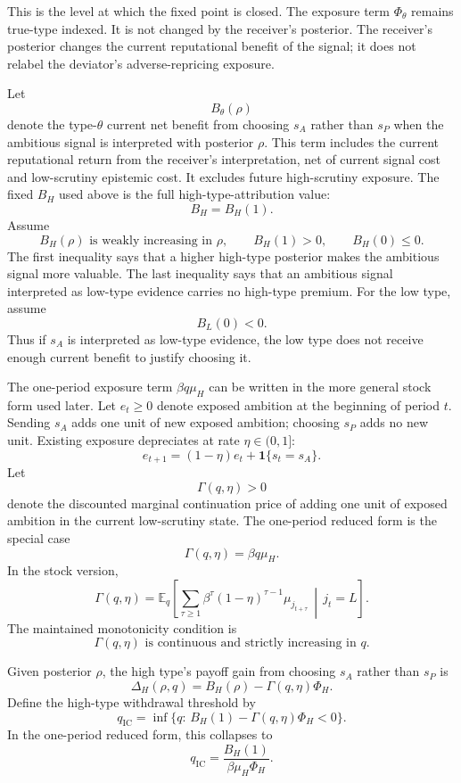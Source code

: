 This is the level at which the fixed point is closed. The exposure term \(\Phi_\theta\) remains true-type indexed. It is not changed by the receiver's posterior. The receiver's posterior changes the current reputational benefit of the signal; it does not relabel the deviator's adverse-repricing exposure.

Let
\[
B_\theta(\rho)
\]
denote the type-\(\theta\) current net benefit from choosing \(s_A\) rather than \(s_P\) when the ambitious signal is interpreted with posterior \(\rho\). This term includes the current reputational return from the receiver's interpretation, net of current signal cost and low-scrutiny epistemic cost. It excludes future high-scrutiny exposure. The fixed \(B_H\) used above is the full high-type-attribution value:
\[
B_H=B_H(1).
\]
Assume
\[
B_H(\rho)\text{ is weakly increasing in }\rho,
\qquad
B_H(1)>0,
\qquad
B_H(0)\le 0.
\]
The first inequality says that a higher high-type posterior makes the ambitious signal more valuable. The last inequality says that an ambitious signal interpreted as low-type evidence carries no high-type premium. For the low type, assume
\[
B_L(0)<0.
\]
Thus if \(s_A\) is interpreted as low-type evidence, the low type does not receive enough current benefit to justify choosing it.

The one-period exposure term \(\beta q\mu_H\) can be written in the more general stock form used later. Let \(e_t\ge 0\) denote exposed ambition at the beginning of period \(t\). Sending \(s_A\) adds one unit of new exposed ambition; choosing \(s_P\) adds no new unit. Existing exposure depreciates at rate \(\eta\in(0,1]\):
\[
e_{t+1}=(1-\eta)e_t+\mathbf{1}\{s_t=s_A\}.
\]
Let
\[
\Gamma(q,\eta)>0
\]
denote the discounted marginal continuation price of adding one unit of exposed ambition in the current low-scrutiny state. The one-period reduced form is the special case
\[
\Gamma(q,\eta)=\beta q\mu_H.
\]
In the stock version,
\[
\Gamma(q,\eta)
=
\mathbb E_q\left[
\sum_{\tau\ge 1}
\beta^\tau (1-\eta)^{\tau-1}\mu_{j_{t+\tau}}
\,\middle|\,j_t=L
\right].
\]
The maintained monotonicity condition is
\[
\Gamma(q,\eta)\text{ is continuous and strictly increasing in }q.
\]

Given posterior \(\rho\), the high type's payoff gain from choosing \(s_A\) rather than \(s_P\) is
\[
\Delta_H(\rho,q)
=
B_H(\rho)-\Gamma(q,\eta)\Phi_H.
\]
Define the high-type withdrawal threshold by
\[
q_{\mathrm{IC}}
=
\inf\{q:\,B_H(1)-\Gamma(q,\eta)\Phi_H<0\}.
\]
In the one-period reduced form, this collapses to
\[
q_{\mathrm{IC}}
=
\frac{B_H(1)}{\beta\mu_H\Phi_H}.
\]


